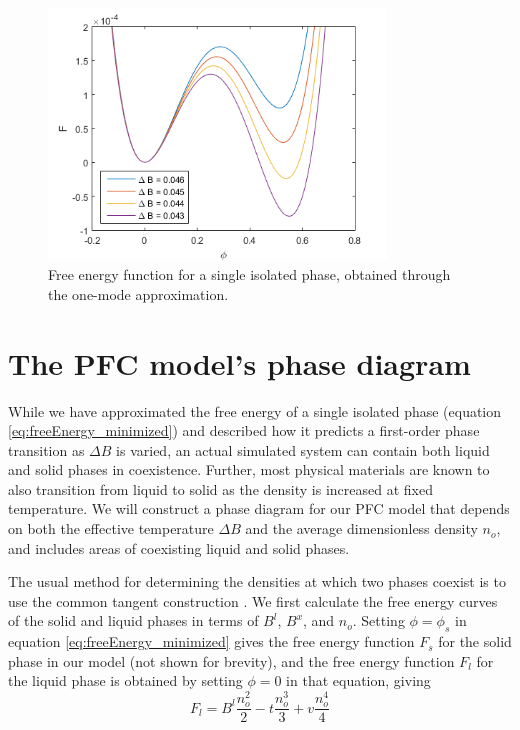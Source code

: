 \begin{figure}[h]
\centering
\includegraphics[width=0.8\textwidth]{fig_pfc/deltaBwells.png}
\caption{Free energy function for a single isolated phase, obtained through the one-mode approximation.}\label{fig:deltaB_wells}
\end{figure}




\section{The PFC model's phase diagram}\label{sec:pfc_phasediag}


While we have approximated the free energy of a single isolated phase (equation \ref{eq:freeEnergy_minimized}) and described how it predicts a first-order phase transition as $\Delta B$ is varied, an actual simulated system can contain both liquid and solid phases in coexistence. Further, most physical materials are known to also transition from liquid to solid as the density is increased at fixed temperature. We will construct a phase diagram for our PFC model that depends on both the effective temperature $\Delta B$ and the average dimensionless density $n_o$, and includes areas of coexisting liquid and solid phases.

The usual method for determining the densities at which two phases coexist is to use the common tangent construction \cite{lupis_materials}. We first calculate the free energy curves of the solid and liquid phases in terms of $B^l$, $B^x$, and $n_o$. Setting $\phi=\phi_s$ in equation \ref{eq:freeEnergy_minimized} gives the free energy function $F_s$ for the solid phase in our model (not shown for brevity), and the free energy function $F_l$ for the liquid phase is obtained by setting $\phi=0$ in that equation, giving
\begin{equation}\label{eq:freeEnergy_minimized_liquid}
F_l = B^l\frac{n_o^2}{2} -t\frac{n_o^3}{3}+v\frac{n_o^4}{4}
\end{equation}

